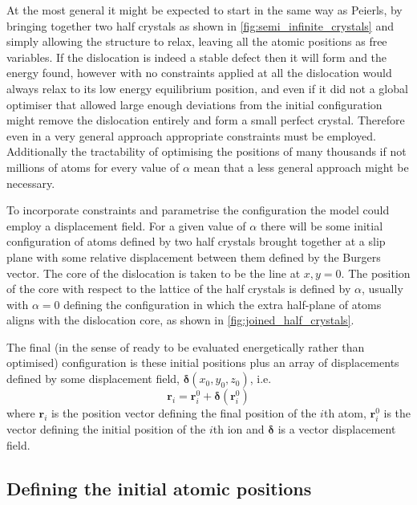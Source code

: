 
At the most general it might be expected to start in the same way as Peierls, by bringing together two half crystals as shown in \autoref{fig:semi_infinite_crystals} and simply allowing the structure to relax, leaving all the atomic positions as free variables. If the dislocation is indeed a stable defect then it will form and the energy found, however with no constraints applied at all the dislocation would always relax to its low energy equilibrium position, and even if it did not a global optimiser that allowed large enough deviations from the initial configuration might remove the dislocation entirely and form a small perfect crystal. Therefore even in a very general approach appropriate constraints must be employed. Additionally the tractability of optimising the positions of many thousands if not millions of atoms for every value of $\alpha$ mean that a less general approach might be necessary. 

To incorporate constraints and parametrise the configuration the model could employ a displacement field. For a given value of $\alpha$ there will be some initial configuration of atoms defined by two half crystals brought together at a slip plane with some relative displacement between them defined by the Burgers vector. The core of the dislocation is taken to be the line at $x,y = 0$. The position of the core with respect to the lattice of the half crystals is defined by $\alpha$, usually with $\alpha=0$ defining the configuration in which the extra half-plane of atoms aligns with the dislocation core, as shown in \autoref{fig:joined_half_crystals}. 

The final (in the sense of ready to be evaluated energetically rather than optimised) configuration is these initial positions plus an array of displacements defined by some displacement field, $\bm{\delta}(x_0, y_0, z_0)$, i.e.
\begin{equation}
\mathbf{r}_i = \mathbf{r}_i^0 + \bm{\delta}(\bm{r}_i^0)
\end{equation}
where $\mathbf{r}_i$ is the position vector defining the final position of the $i$th atom, $\mathbf{r}_i^0$ is the vector defining the initial position of the $i$th ion and $\bm{\delta}$ is a vector displacement field.


%
%
\subsection{Defining the initial atomic positions}


